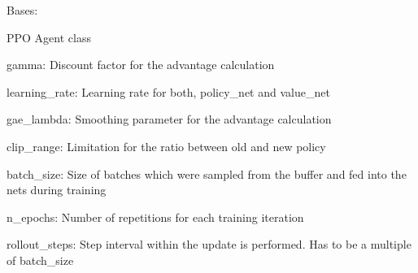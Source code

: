 \documentclass[letterpaper,10pt,english]{sphinxmanual}
\begin{document}
\begin{fulllineitems}
\label{\detokenize{agents.reinforcement_learning:agents.reinforcement_learning.ppo.PPO}}
\sphinxAtStartPar
Bases: 

\sphinxAtStartPar
PPO Agent class

\begin{fulllineitems}
\label{\detokenize{agents.reinforcement_learning:agents.reinforcement_learning.ppo.PPO.__init__}}
\begin{DUlineblock}{0em}
\item[] gamma: Discount factor for the advantage calculation
\item[] learning\_rate: Learning rate for both, policy\_net and value\_net
\item[] gae\_lambda: Smoothing parameter for the advantage calculation
\item[] clip\_range: Limitation for the ratio between old and new policy
\item[] batch\_size: Size of batches which were sampled from the buffer and fed into the nets during training
\item[] n\_epochs: Number of repetitions for each training iteration
\item[] rollout\_steps: Step interval within the update is performed. Has to be a multiple of batch\_size
\end{DUlineblock}

\end{fulllineitems}


\end{fulllineitems}
\end{document}
